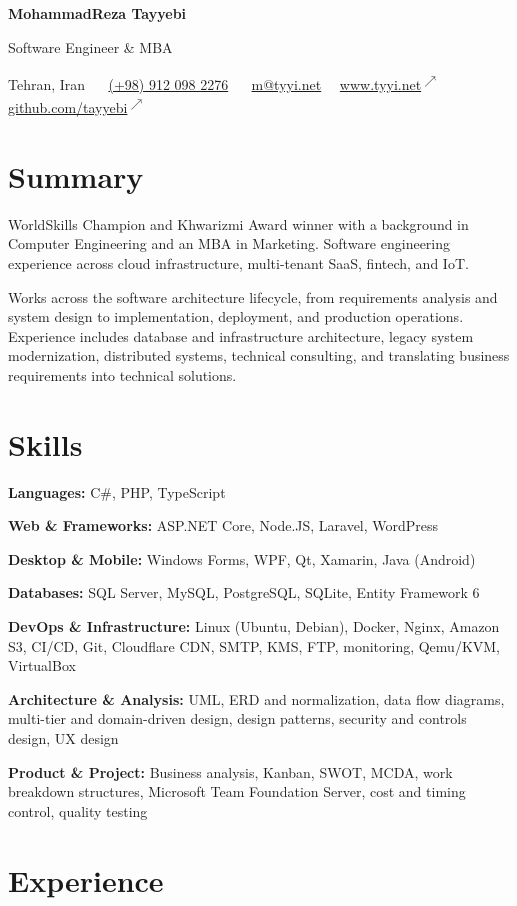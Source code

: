 \documentclass[10pt,letterpaper]{article}
\newcommand{\deemph}[1]{\textcolor{gray}{#1}}
\newcommand{\sep}{\ \deemph{\textbar}\ }
\newcommand{\linkarrow}{\textsuperscript{\textcolor{heritagered}{$\nearrow$}}}
\newcommand{\extlink}[2]{\href{#1}{#2}\nobreak\linkarrow}
\newcommand{\skill}[2]{\par\addvspace{2pt}\textbf{#1:} #2\par}
\begin{document}
{\fontsize{22}{24}\selectfont\bfseries\color{ultramarine}MohammadReza Tayyebi}\par
\vspace{2pt}
{\large\color{marineblue}Software Engineer \& MBA}\par
\vspace{5pt}
Tehran, Iran \sep
\href{tel:+989120982276}{(+98) 912 098 2276} \sep
\href{mailto:m@tyyi.net}{m@tyyi.net}\sep
\extlink{https://www.tyyi.net}{www.tyyi.net}\sep
\extlink{https://github.com/tayyebi}{github.com/tayyebi}\par

\section{Summary}
WorldSkills Champion and Khwarizmi Award winner with a background in Computer Engineering and an MBA in Marketing. Software engineering experience across cloud infrastructure, multi-tenant SaaS, fintech, and IoT.

Works across the software architecture lifecycle, from requirements analysis and system design to implementation, deployment, and production operations. Experience includes database and infrastructure architecture, legacy system modernization, distributed systems, technical consulting, and translating business requirements into technical solutions.

\section{Skills}
\skill{Languages}{C\#, PHP, TypeScript}
\skill{Web \& Frameworks}{ASP.NET Core, Node.JS, Laravel, WordPress}
\skill{Desktop \& Mobile}{Windows Forms, WPF, Qt, Xamarin, Java (Android)}
\skill{Databases}{SQL Server, MySQL, PostgreSQL, SQLite, Entity Framework 6}
\skill{DevOps \& Infrastructure}{Linux (Ubuntu, Debian), Docker, Nginx, Amazon S3, CI/CD, Git, Cloudflare CDN, SMTP, KMS, FTP, monitoring, Qemu/KVM, VirtualBox}
\skill{Architecture \& Analysis}{UML, ERD and normalization, data flow diagrams, multi-tier and domain-driven design, design patterns, security and controls design, UX design}
\skill{Product \& Project}{Business analysis, Kanban, SWOT, MCDA, work breakdown structures, Microsoft Team Foundation Server, cost and timing control, quality testing}

\section{Experience}
\end{document}
